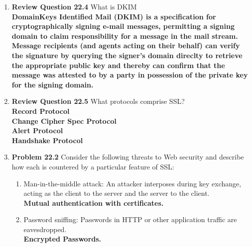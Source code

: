 \documentclass[12pt]{article}
\begin{document}
\renewcommand{\headrulewidth}{0.4pt}
\vspace{-3mm}
\begin{enumerate}
  \item \textbf{Review Question 22.4} What is DKIM \\

  \textbf{DomainKeys Identified Mail (DKIM) is a specification for cryptographically signing e-mail messages, permitting a signing domain to claim responsibility for a message in the mail stream. Message recipients (and agents acting on their behalf) can verify the signature by querying the signer's domain direclty to retrieve the appropriate public key and thereby can confirm that the message was attested to by a party in possession of the private key for the signing domain.} \\

  \item \textbf{Review Question 22.5} What protocols comprise SSL? \\

  \textbf{Record Protocol} \\
  \textbf{Change Cipher Spec Protocol} \\
  \textbf{Alert Protocol} \\
  \textbf{Handshake Protocol} \\


  \item \textbf{Problem 22.2} Consider the following threats to Web security and describe how each is countered by a particular feature of SSL: \\
  \begin{enumerate}
    \item Man-in-the-middle attack: An attacker interposes during key exchange, acting as the client to the server and the server to the client. \\

    \textbf{Mutual authentication with certificates.} \\

    \item Password sniffing: Passwords in HTTP or other application traffic are eavesdropped. \\

    \textbf{Encrypted Passwords.} \\


\end{enumerate}
\end{enumerate}
\end{document}
